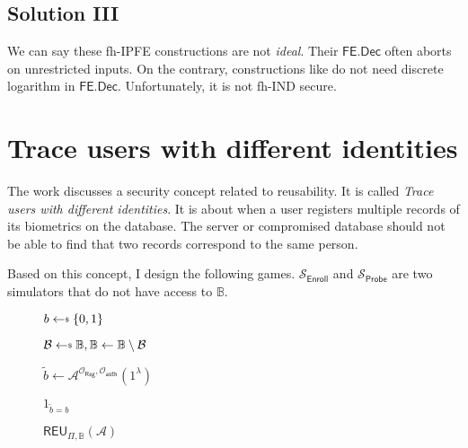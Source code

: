 \subsection{Solution III}

We can say these fh-IPFE constructions \cite{cryptoeprint:2015/1255, 10.1007/978-3-319-45871-7_24, cryptoeprint:2016/440} are not \emph{ideal}. Their $\textsf{FE.Dec}$ often aborts on unrestricted inputs. On the contrary, constructions like \cite{10.1007/978-3-030-90567-5_33} do not need discrete logarithm in $\textsf{FE.Dec}$. Unfortunately, it is not \textsf{fh-IND} secure.


\newpage


\section{Trace users with different identities}

The work \cite{simoens2012framework} discusses a security concept related to reusability. It is called \emph{Trace users with different identities}. It is about when a user registers multiple records of its biometrics on the database. The server or compromised database should not be able to find that two records correspond to the same person.

Based on this concept, I design the following games. $\mathcal{S}_{\textsf{Enroll}}$ and $\mathcal{S}_{\textsf{Probe}}$ are two simulators that do not have access to $\mathbb{B}$.

\begin{figure}[H]
\centering

	\begin{minipage}[t]{0.45\textwidth}
	\begin{algorithm}[H]
	\caption{$\textsf{REU}_{\Pi, \mathbb{B}}(\mathcal{A})$}
	\begin{algorithmic}[1]
		\State $b \getsdollar \{0, 1\}$

		\State $\mathcal{B} \getsdollar \mathbb{B}, \mathbb{B} \gets \mathbb{B} \setminus \mathcal{B}$

		\State $\tilde{b} \gets \mathcal{A}^{\mathcal{O}_{\textsf{Reg}}, \mathcal{O}_{\textsf{auth}}}(1^\lambda)$
 
		\State \Return $1_{\tilde{b} = b}$
	\end{algorithmic}
	\end{algorithm}
	\end{minipage}

\end{figure}

